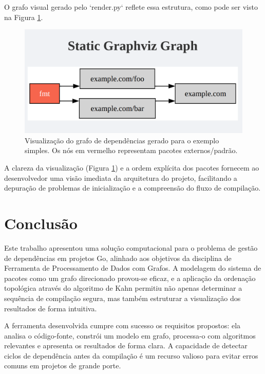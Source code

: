 \documentclass[12pt]{article}
\begin{document}
O grafo visual gerado pelo `render.py` reflete essa estrutura, como pode ser visto na Figura \ref{fig:grafoExemplo}.

\begin{figure}[ht]
\centering
\includegraphics[width=1\textwidth]{ordemTopologica.png} 
\caption{Visualização do grafo de dependências gerado para o exemplo simples. Os nós em vermelho representam pacotes externos/padrão.}
\label{fig:grafoExemplo}
\end{figure}

A clareza da visualização (Figura \ref{fig:grafoExemplo}) e a ordem explícita dos pacotes fornecem ao desenvolvedor uma visão imediata da arquitetura do projeto, facilitando a depuração de problemas de inicialização e a compreensão do fluxo de compilação.

\section{Conclusão}

Este trabalho apresentou uma solução computacional para o problema de gestão de dependências em projetos Go, alinhado aos objetivos da disciplina de Ferramenta de Processamento de Dados com Grafos. A modelagem do sistema de pacotes como um grafo direcionado provou-se eficaz, e a aplicação da ordenação topológica através do algoritmo de Kahn \cite{kahn1962} permitiu não apenas determinar a sequência de compilação segura, mas também estruturar a visualização dos resultados de forma intuitiva.

A ferramenta desenvolvida cumpre com sucesso os requisitos propostos: ela analisa o código-fonte, constrói um modelo em grafo, processa-o com algoritmos relevantes e apresenta os resultados de forma clara. A capacidade de detectar ciclos de dependência antes da compilação é um recurso valioso para evitar erros comuns em projetos de grande porte.
\end{document}

